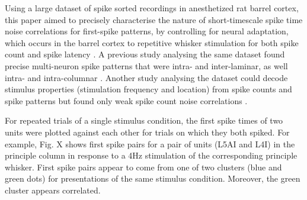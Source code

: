 \documentclass{article}
\begin{document}
Using a large dataset of spike sorted recordings in anesthetized rat barrel cortex, this paper aimed to precisely characterise the nature of short-timescale spike time noise correlations for first-spike patterns, by controlling for neural adaptation, which occurs in the barrel cortex to repetitive whisker stimulation for both spike count \cite{ahissar2000transformation, ahissar2001temporal, kheradpezhouh2017response, khatri2009stimulus, martin2014tactile, barros2019response} and spike latency \cite{ahissar2000transformation, ahissar2001temporal, kheradpezhouh2017response}.
A previous study analysing the same dataset found precise multi-neuron spike patterns that were intra- and inter-laminar, as well intra- and intra-columnar \cite{reyes2014laminar}. Another study analysing the dataset could decode stimulus properties (stimulation frequency and location) from spike counts and spike patterns but found only weak spike count noise correlations \cite{reyes2015high}. 




For repeated trials of a single stimulus condition, the first spike times of two units were plotted against each other for trials on which they both spiked. For example, Fig. X shows first spike pairs for a pair of units (L5AI and L4I) in the principle column in response to a 4Hz stimulation of the corresponding principle whisker. First spike pairs appear to come from one of two clusters (blue and green dots) for presentations of the same stimulus condition. Moreover, the green cluster appears correlated. 
\end{document}
